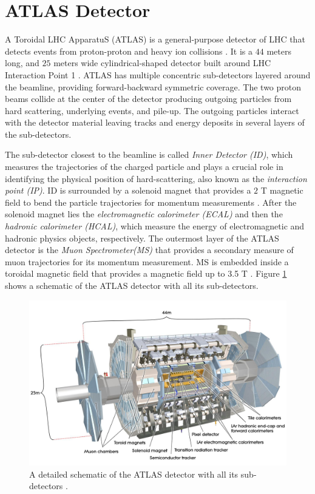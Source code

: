 \section{ATLAS Detector}
\label{sec:ATLAS}

A Toroidal LHC ApparatuS (ATLAS) is a general-purpose detector of LHC that detects events from proton-proton and heavy ion collisions \cite{ATLAS}. It is a $44$ meters long, and $25$ meters wide cylindrical-shaped detector built around LHC Interaction Point 1 \cite{ATLAS}. ATLAS has multiple concentric sub-detectors layered around the beamline, providing forward-backward symmetric coverage. The two proton beams collide at the center of the detector producing outgoing particles from hard scattering, underlying events, and pile-up. The outgoing particles interact with the detector material leaving tracks and energy deposits in several layers of the sub-detectors. 

The sub-detector closest to the beamline is called \textit{Inner Detector (ID)}, which measures the trajectories of the charged particle and plays a crucial role in identifying the physical position of hard-scattering, also known as the \textit{interaction point (IP)}. ID is surrounded by a solenoid magnet that provides a $2$ T magnetic field to bend the particle trajectories for momentum measurements \cite{ATLAS}. After the solenoid magnet lies the \textit{electromagnetic calorimeter (ECAL)} and then the \textit{hadronic calorimeter (HCAL)}, which measure the energy of electromagnetic and hadronic physics objects, respectively. The outermost layer of the ATLAS detector is the \textit{Muon Spectrometer(MS)} that provides a secondary measure of muon trajectories for its momentum measurement. MS is embedded inside a toroidal magnetic field that provides a magnetic field up to 3.5 T \cite{ATLAS}. Figure \ref{fig:ATLAS} shows a schematic of the ATLAS detector with all its sub-detectors.

\begin{figure}[!htb]
    \centering
    \includegraphics[width=.98\linewidth]{figures/LHC/AtlasDetector.png}
    \caption{ A detailed schematic of the ATLAS detector with all its sub-detectors \cite{ATLAS}.\label{fig:ATLAS}}
\end{figure}

